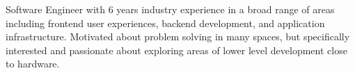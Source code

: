 

\begin{cvparagraph}

Software Engineer with 6 years industry experience in a broad range of areas including frontend user experiences, backend development, and application infrastructure. Motivated about problem solving in many spaces, but specifically interested and passionate about exploring areas of lower level development close to hardware.
\end{cvparagraph}
